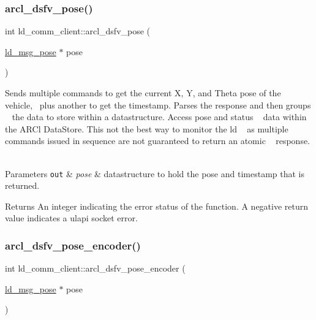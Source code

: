 \subsubsection{\texorpdfstring{arcl\+\_\+dsfv\+\_\+pose()}{arcl\_dsfv\_pose()}}
{\footnotesize\ttfamily int ld\+\_\+comm\+\_\+client\+::arcl\+\_\+dsfv\+\_\+pose (\begin{DoxyParamCaption}\item[{\hyperlink{structld__msg__pose}{ld\+\_\+msg\+\_\+pose} $\ast$}]{pose }\end{DoxyParamCaption})}

Sends multiple commands to get the current X, Y, and Theta pose of the vehicle,~\newline
plus another to get the timestamp. Parses the response and then groups ~\newline
the data to store within a datastructure. Access pose and status ~\newline
data within the A\+R\+Cl Data\+Store. This not the best way to monitor the ld ~\newline
as multiple commands issued in sequence are not guaranteed to return an atomic ~\newline
response. ~\newline

\begin{DoxyParams}[1]{Parameters}
\mbox{\tt out}  & {\em pose} & datastructure to hold the pose and timestamp that is returned. \\
\hline
\end{DoxyParams}
\begin{DoxyReturn}{Returns}
An integer indicating the error status of the function. A negative return value indicates a ulapi socket error. 
\end{DoxyReturn}
\mbox{\label{classld__comm__client_a8fe145161e824738ccd351c5533b9d1e}} 
\subsubsection{\texorpdfstring{arcl\+\_\+dsfv\+\_\+pose\+\_\+encoder()}{arcl\_dsfv\_pose\_encoder()}}
{\footnotesize\ttfamily int ld\+\_\+comm\+\_\+client\+::arcl\+\_\+dsfv\+\_\+pose\+\_\+encoder (\begin{DoxyParamCaption}\item[{\hyperlink{structld__msg__pose}{ld\+\_\+msg\+\_\+pose} $\ast$}]{pose }\end{DoxyParamCaption})}

